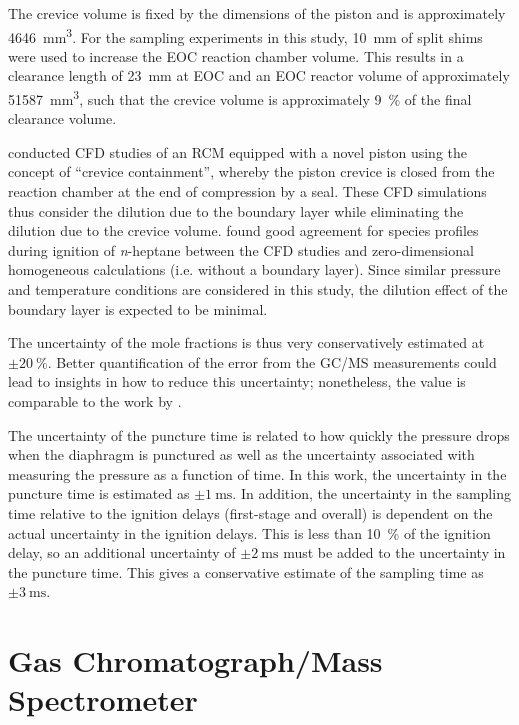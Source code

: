 \documentclass[../main.tex]{subfiles}
\begin{document}
The crevice volume is fixed by the dimensions of the piston and is
approximately \SI{4646}{\milli\meter\cubed}. For the sampling experiments
in this study, \SI{10}{\milli\meter} of split shims were used to increase
the EOC reaction chamber volume. This results in a clearance length of
\SI{23}{\milli\meter} at EOC and an EOC reactor volume of approximately
\SI{51587}{\milli\meter\cubed}, such that the crevice volume is
approximately \SI{9}{\percent} of the final clearance volume.

\textcite{Mittal2012a} conducted CFD studies of an RCM equipped with a
novel piston using the concept of ``crevice containment'', whereby the
piston crevice is closed from the reaction chamber at the end of
compression by a seal. These CFD simulations thus consider the dilution
due to the boundary layer while eliminating the dilution due to the
crevice volume. \textcite{Mittal2012a} found good agreement for species
profiles during ignition of \textit{n}-heptane between the CFD studies and zero-dimensional
homogeneous calculations (i.e. without a boundary layer). Since similar
pressure and temperature conditions are considered in this study, the
dilution effect of the boundary layer is expected to be minimal.

The uncertainty of the mole fractions is thus very conservatively estimated
at $\pm\SI{20}{\percent}$. Better quantification of the error from the
GC/MS measurements could lead to insights in how to reduce this uncertainty;
nonetheless, the value is comparable to the work by \textcite{Walton2011,
Karwat2012, Karwat2013, Karwat2011a}.

The uncertainty of the puncture time is related to how quickly the pressure
drops when the diaphragm is punctured as well as the uncertainty associated
with measuring the pressure as a function of time. In this work, the
uncertainty in the puncture time is estimated as $\pm\SI{1}{\milli\second}$.
In addition, the uncertainty in the sampling time relative to the ignition
delays (first-stage and overall) is dependent on the actual uncertainty
in the ignition delays. This is less than \SI{10}{\percent} of the ignition
delay, so an additional uncertainty of $\pm\SI{2}{\milli\second}$ must be
added to the uncertainty in the puncture time. This gives a conservative
estimate of the sampling time as $\pm\SI{3}{\milli\second}$.

\section{Gas Chromatograph/Mass Spectrometer}
\label{sec:gcms}
\end{document}

